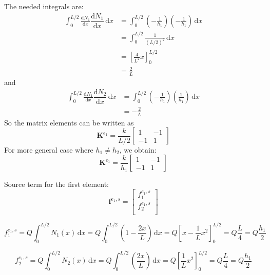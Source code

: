 \documentclass[a4paper,12pt]{article} %
\begin{document}
The needed integrals are:
\begin{align*}
\int_{0}^{L/2} \frac{\mathrm{d}N_{1}}{\mathrm{d}x} \dfrac{\mathrm{d}N_{1}}{\mathrm{d}x}\, \mathrm{d}x & =
\int_{0}^{L/2} \left(-\frac{1}{h_{1}}\right) \left( -\frac{1}{h_{1}} \right)\, \mathrm{d}x \\
& = \int_{0}^{L/2} \frac{1}{(L/2)^2}\, \mathrm{d}x \\
& = \left[ \frac{4}{L^2}x \right]_{0}^{L/2} \\
& = \frac{2}{L}
\end{align*}
and
\begin{align*}
\int_{0}^{L/2} \frac{\mathrm{d}N_{1}}{\mathrm{d}x} \dfrac{\mathrm{d}N_{2}}{\mathrm{d}x}\, \mathrm{d}x & =
\int_{0}^{L/2} \left(-\frac{1}{h_{1}}\right) \left( \frac{1}{h_{1}} \right)\, \mathrm{d}x \\
& = -\frac{2}{L}
\end{align*}
So the matrix elements can be written as
\begin{equation}
\mathbf{K}^{e_{1}} = \frac{k}{L/2} \begin{bmatrix}
1  & -1 \\
-1 & 1
\end{bmatrix}
\end{equation}
%
For more general case where $h_{1} \neq h_{2}$, we obtain:
\begin{equation}
\mathbf{K}^{e_{1}} = \frac{k}{h_{1}} \begin{bmatrix}
1  & -1 \\
-1 & 1
\end{bmatrix}
\end{equation}

Source term for the first element:
\begin{equation}
\mathbf{f}^{e_{1},s} = \begin{bmatrix}
f^{e_{1},s}_{1} \\
f^{e_{1},s}_{2} \\
\end{bmatrix}
\end{equation}

\begin{equation}
f^{e_{1},s}_{1} = Q \int_{0}^{L/2} N_{1}(x)\,\mathrm{d}x =
Q \int_{0}^{L/2} \left( 1 - \dfrac{2x}{L} \right) \,\mathrm{d}x =
Q \left[ x - \frac{1}{L} x^{2} \right]_{0}^{L/2} =
Q \frac{L}{4} = Q \frac{h_1}{2}
\end{equation}

\begin{equation}
f^{e_{1},s}_{2} = Q \int_{0}^{L/2} N_{2}(x)\,\mathrm{d}x =
Q \int_{0}^{L/2} \left( \dfrac{2x}{L} \right) \,\mathrm{d}x =
Q \left[ \frac{1}{L}x^{2} \right]_{0}^{L/2} =
Q \frac{L}{4} = Q \frac{h_1}{2}
\end{equation}
\end{document}
